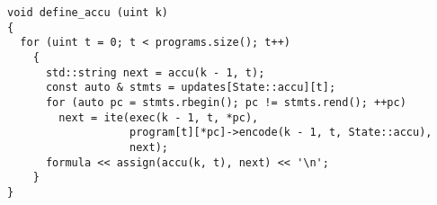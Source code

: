 %
%

\begin{lstlisting}[style=c++]
void define_accu (uint k)
{
  for (uint t = 0; t < programs.size(); t++)
    {
      std::string next = accu(k - 1, t);
      const auto & stmts = updates[State::accu][t];
      for (auto pc = stmts.rbegin(); pc != stmts.rend(); ++pc)
        next = ite(exec(k - 1, t, *pc),
                   program[t][*pc]->encode(k - 1, t, State::accu),
                   next);
      formula << assign(accu(k, t), next) << '\n';
    }
}
\end{lstlisting}

